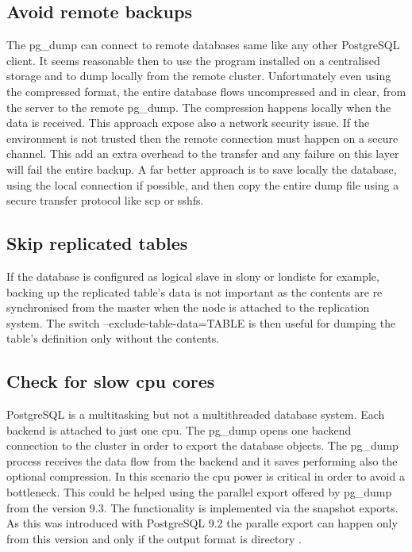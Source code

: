 \subsection{Avoid remote backups}
The pg\_dump can connect to remote databases same like any other PostgreSQL client.
It seems reasonable then to use the program installed on a centralised storage and to dump locally 
from the remote cluster.\newline 
Unfortunately even using the compressed format, the entire database flows uncompressed and in 
clear, from the server to the remote pg\_dump. The compression happens locally when the data is 
received.\newline
This approach expose also a network security issue. If the environment is not trusted then the 
remote connection must happen on a secure channel. This add an extra overhead to the transfer and 
any failure on this layer will fail the entire backup.\newline
A far better approach is to save locally the database, using the local connection if possible, and 
then copy the entire dump file using a secure transfer protocol like scp or sshfs.

\subsection{Skip replicated tables}
If the database is configured as logical slave in slony or londiste for example, backing up the 
replicated table's data is not important as the contents are re synchronised from the master when 
the node is attached to the replication system. The switch --exclude-table-data=TABLE is then 
useful for dumping the table's definition only without the contents.

\subsection{Check for slow cpu cores}
PostgreSQL is a multitasking but not a multithreaded database system. Each backend is attached 
to just one cpu. The pg\_dump opens one backend connection to the cluster in order to 
export the database objects. The pg\_dump process receives the data flow from the backend and it 
saves performing also the optional compression. In this scenario the cpu power is critical in order 
to avoid a bottleneck. This could be helped using the parallel export offered by pg\_dump from the 
version 9.3. The functionality is implemented via  the snapshot exports. As this was introduced 
with PostgreSQL 9.2 the paralle export can happen only from this version and only if the output 
format is directory . 

